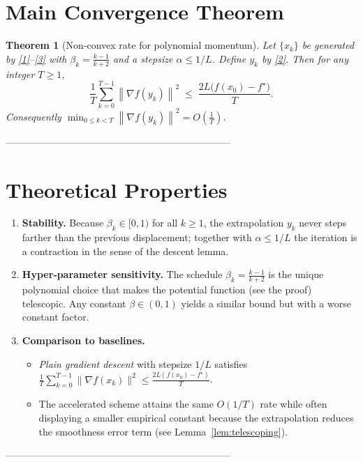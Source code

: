 \documentclass{article}
\newtheorem{theorem}{Theorem}
\newcommand{\norm}[1]{\left\lVert#1\right\rVert}
\newcommand{\grad}{\nabla}
\begin{document}
\section*{Main Convergence Theorem}
\begin{theorem}[Non‑convex rate for polynomial momentum]\label{thm:rate}
Let $\{x_k\}$ be generated by \eqref{1}–\eqref{3} with $\beta_k=\frac{k-1}{k+2}$ and a stepsize $\alpha\le 1/L$.
Define $y_k$ by \eqref{2}. Then for any integer $T\ge 1$,
\[
\frac{1}{T}\sum_{k=0}^{T-1}\norm{\grad f(y_k)}^{2}
\;\le\;
\frac{2L\bigl(f(x_0)-f^\star\bigr)}{T}.
\tag{4}
\]
Consequently $\displaystyle \min_{0\le k<T}\norm{\grad f(y_k)}^{2}=O\!\left(\frac1T\right)$.
\end{theorem}

---------------------------------------------------------------------

\section*{Theoretical Properties}
\begin{enumerate}[label=\arabic*.]
\item \textbf{Stability.} Because $\beta_k\in[0,1)$ for all $k\ge1$, the extrapolation
$y_k$ never steps farther than the previous displacement; together with $\alpha\le1/L$ the
iteration is a contraction in the sense of the descent lemma.
\item \textbf{Hyper‑parameter sensitivity.} The schedule $\beta_k=\frac{k-1}{k+2}$ is the
unique polynomial choice that makes the potential function (see the proof) telescopic.
Any constant $\beta\in(0,1)$ yields a similar bound but with a worse constant factor.
\item \textbf{Comparison to baselines.}
\begin{itemize}
\item \emph{Plain gradient descent} with stepsize $1/L$ satisfies
$\frac{1}{T}\sum_{k=0}^{T-1}\|\grad f(x_k)\|^2\le\frac{2L(f(x_0)-f^\star)}{T}$.
\item The accelerated scheme attains the same $O(1/T)$ rate while
often displaying a smaller empirical constant because the extrapolation reduces
the smoothness error term (see Lemma~\ref{lem:telescoping}).
\end{itemize}
\end{enumerate}

---------------------------------------------------------------------
\end{document}
